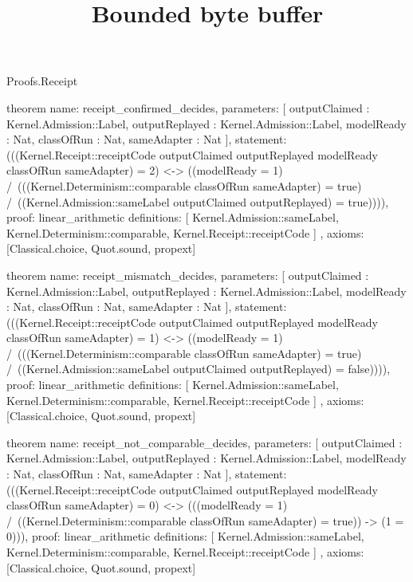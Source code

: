 \begin{lexlean}{Proofs.Receipt}
\title{Bounded byte buffer}
\begin{semanticmodule}
theorem{
  name: receipt_confirmed_decides,
  parameters: [
    outputClaimed : Kernel.Admission::Label,
    outputReplayed : Kernel.Admission::Label,
    modelReady : Nat,
    classOfRun : Nat,
    sameAdapter : Nat
  ],
  statement: (((Kernel.Receipt::receiptCode outputClaimed outputReplayed modelReady classOfRun sameAdapter) = 2) <-> ((modelReady = 1) /\ (((Kernel.Determinism::comparable classOfRun sameAdapter) = true) /\ ((Kernel.Admission::sameLabel outputClaimed outputReplayed) = true)))),
  proof: linear_arithmetic{
    definitions: [
      Kernel.Admission::sameLabel,
      Kernel.Determinism::comparable,
      Kernel.Receipt::receiptCode
    ]
  },
  axioms: [Classical.choice, Quot.sound, propext]
}

theorem{
  name: receipt_mismatch_decides,
  parameters: [
    outputClaimed : Kernel.Admission::Label,
    outputReplayed : Kernel.Admission::Label,
    modelReady : Nat,
    classOfRun : Nat,
    sameAdapter : Nat
  ],
  statement: (((Kernel.Receipt::receiptCode outputClaimed outputReplayed modelReady classOfRun sameAdapter) = 1) <-> ((modelReady = 1) /\ (((Kernel.Determinism::comparable classOfRun sameAdapter) = true) /\ ((Kernel.Admission::sameLabel outputClaimed outputReplayed) = false)))),
  proof: linear_arithmetic{
    definitions: [
      Kernel.Admission::sameLabel,
      Kernel.Determinism::comparable,
      Kernel.Receipt::receiptCode
    ]
  },
  axioms: [Classical.choice, Quot.sound, propext]
}

theorem{
  name: receipt_not_comparable_decides,
  parameters: [
    outputClaimed : Kernel.Admission::Label,
    outputReplayed : Kernel.Admission::Label,
    modelReady : Nat,
    classOfRun : Nat,
    sameAdapter : Nat
  ],
  statement: (((Kernel.Receipt::receiptCode outputClaimed outputReplayed modelReady classOfRun sameAdapter) = 0) <-> (((modelReady = 1) /\ ((Kernel.Determinism::comparable classOfRun sameAdapter) = true)) -> (1 = 0))),
  proof: linear_arithmetic{
    definitions: [
      Kernel.Admission::sameLabel,
      Kernel.Determinism::comparable,
      Kernel.Receipt::receiptCode
    ]
  },
  axioms: [Classical.choice, Quot.sound, propext]
}
\end{semanticmodule}
\end{lexlean}
